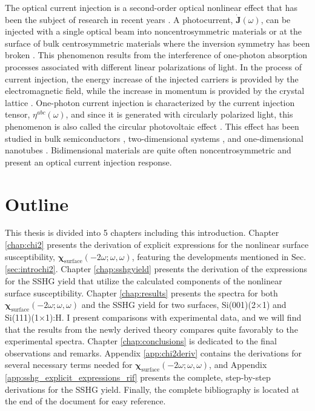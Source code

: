 The optical current injection is a second-order optical nonlinear effect that
has been the subject of research in recent years
\cite{arzatePRB14,bhatPRB05,fraserPRL99,hachePRL97,lamanAPL99}. A
photocurrent, $\mathbf{\dot{J}}(\omega)$, can be injected with a single
optical beam into noncentrosymmetric materials or at the surface of bulk
centrosymmetric materials where the inversion symmetry has been broken
\cite{arzatePRB14}. This phenomenon results from the interference of one-photon 
absorption processes associated with different linear polarizations of light. In
the process of current injection, the energy increase of the injected carriers
is provided by the electromagnetic field, while the increase in momentum is
provided by the crystal lattice \cite{arzatePRB14}. One-photon current injection
is characterized by the current injection tensor, $\eta^{abc}(\omega)$, and
since it is generated with circularly polarized light, this phenomenon is also
called the circular photovoltaic effect \cite{sturmanCRCP92}. This effect has
been studied in bulk semiconductors \cite{hachePRL97, sipePRB00},
two-dimensional systems \cite{melePRB00, cabellosPRB11}, and one-dimensional
nanotubes \cite{melePRB00}. Bidimensional materials are quite often
noncentrosymmetric and present an optical current injection response.



\section{Outline}
This thesis is divided into 5 chapters including this introduction. Chapter
\ref{chap:chi2} presents the derivation of explicit expressions for the
nonlinear surface susceptibility,
$\boldsymbol{\chi}_{\mathrm{surface}}(-2\omega;\omega,\omega)$, featuring the
developments mentioned in Sec. \ref{sec:introchi2}. Chapter \ref{chap:sshgyield}
presents the derivation of the expressions for the SSHG yield that utilize the
calculated components of the nonlinear surface susceptibility. Chapter
\ref{chap:results} presents the spectra for both
$\boldsymbol{\chi}_{\mathrm{surface}}(-2\omega;\omega,\omega)$ and the SSHG
yield for two surfaces, Si(001)(2$\times$1) and Si(111)(1$\times$1):H. I present
comparisons with experimental data, and we will find that the results from the
newly derived theory compares quite favorably to the experimental spectra.
Chapter \ref{chap:conclusions} is dedicated to the final observations and
remarks. Appendix \ref{app:chi2deriv} contains the derivations for several
necessary terms needed for
$\boldsymbol{\chi}_{\mathrm{surface}}(-2\omega;\omega,\omega)$, and Appendix
\ref{app:sshg_explicit_expressions_rif} presents the complete, step-by-step
derivations for the SSHG yield. Finally, the complete bibliography is located at
the end of the document for easy reference.

\stopcontents[chapters]
